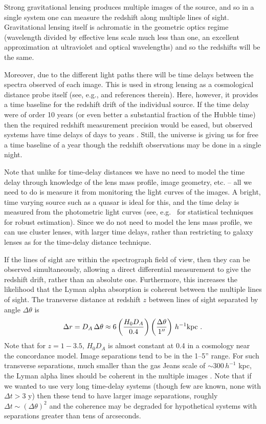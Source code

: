 \documentclass[preprint2, 10pt]{aastex}
\newcommand{\be}{\begin{equation}}
\newcommand{\ee}{\end{equation}}
\begin{document}
Strong gravitational lensing produces multiple images of the source, 
and so in a single system one can measure the redshift along multiple 
lines of sight.  Gravitational lensing itself is achromatic in the 
geometric optics regime (wavelength divided by effective lens scale 
much less than one, an excellent approximation at ultraviolet and optical 
wavelengths) 
and so the redshifts will be the same. 

Moreover, due to the different light paths there will be time delays 
between the spectra observed of each image.  This is used in strong 
lensing as a cosmological distance probe itself (see, e.g., \citet{13061272} 
and references therein).  Here, however, it provides a time baseline for 
the redshift drift of the individual source.  If the time delay were of 
order 10 years (or even better a substantial fraction of the Hubble time) 
then the required redshift measurement precision would be eased, but 
observed systems have time delays of days to years 
\citep{2007ApJ...662...62F,2008ApJ...676..761F, 2013ApJ...764..186F}.  
Still, the universe 
is giving us for free a time baseline of a year though the redshift 
observations may be done in a single night.  

Note that unlike for time-delay distances 
we have no need to model the time delay through knowledge of the lens mass 
profile, image geometry, etc. -- all we need to do is measure it from 
monitoring the light curves of the images.  A bright, time varying source 
such as a quasar is ideal for this, and the time delay is measured from 
the photometric light curves (see, e.g.\ \citet{tewes,hkl} for statistical 
techniques for robust estimation).  
Since we do not need to model the lens mass profile, we can 
use cluster lenses, with larger time delays, rather than restricting to 
galaxy lenses as for the time-delay distance technique. 

If the lines of sight are within the spectrograph field of view, 
then they can be 
observed simultaneously, allowing a direct differential measurement to give 
the redshift drift, rather than an absolute one.  Furthermore, this increases 
the likelihood that the Lyman alpha absorption is coherent between the 
multiple lines of sight.  The transverse distance at redshift $z$ between 
lines of sight separated by angle $\Delta\theta$ is 
\be 
\Delta r=D_A\,\Delta\theta\approx 
6\left(\frac{H_0D_A}{0.4}\right)\left(\frac{\Delta\theta}{1''}\right)\, 
h^{-1}{\rm kpc} \ . 
\ee 
Note that for $z=1-3.5$, $H_0D_A$ is almost constant at 0.4 in a 
cosmology near the concordance model.  Image separations tend to be in 
the 1--5'' range.  For such transverse separations, much smaller than 
the gas Jeans scale of $\sim300\,h^{-1}$ kpc, the Lyman alpha lines 
should be coherent in the multiple images \citep{09100250}.  
Note that if we wanted to 
use very long time-delay systems (though few are known, none with 
$\Delta t>3$ y) then these tend to have larger image separations, roughly 
$\Delta t\sim(\Delta\theta)^2$ and the coherence may be degraded for 
hypothetical systems with separations greater than tens of arcseconds. 
\end{document}
